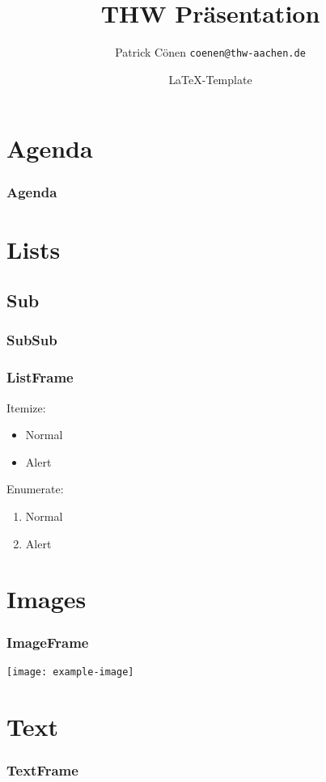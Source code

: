 \documentclass{beamer}
\title{THW Präsentation}
\author{Patrick Cönen \texttt{coenen@thw-aachen.de}}
\date{\LaTeX-Template\\\insertauthor}
\begin{document}
\begin{frame}
  \titlepage
\end{frame}

\section*{Agenda}
\begin{frame}
  \frametitle{Agenda}
  \tableofcontents
\end{frame}

\section{Lists}
\subsection{Sub}
\subsubsection{SubSub}

\begin{frame}
  \frametitle{ListFrame}
  Itemize:
  \begin{itemize}
    \item{Normal}
    \item<alert@1>{Alert}
  \end{itemize}
  Enumerate:
  \begin{enumerate}
    \item{Normal}
    \item<alert@1>{Alert}
  \end{enumerate}
\end{frame}

\section{Images}

\begin{frame}
  \frametitle{ImageFrame}
  \centering
  \texttt{[image: example-image]}
\end{frame}

\section{Text}

\begin{frame}
  \frametitle{TextFrame}
  \small{}
  \blindtext
\end{frame}
\end{document}

